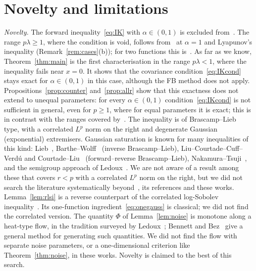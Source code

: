 \documentclass[11pt]{amsart}
\theoremstyle{definition}
\begin{document}
\section{Novelty and limitations}
\emph{Novelty.} The forward inequality~\eqref{eq:IK} with $\alpha\in(0,1)$ is excluded from~\cite[Thm.~9(i)]{IK25}.
The range $p\lambda\ge1$, where the condition is void, follows from~\cite[Thm.~9(i)]{IK25} at $\alpha=1$ and
Lyapunov's inequality (Remark~\ref{rem:cases}(b)); for two functions this is~\cite[Prop.~1.4(a)]{MF}. As far as we
know, Theorem~\ref{thm:main} is the first characterisation in the range $p\lambda<1$, where the inequality fails near
$x=0$. It shows that the covariance condition~\eqref{eq:IKcond} stays exact for $\alpha\in(0,1)$ in this case,
although the FB method does not apply. Propositions~\ref{prop:counter} and~\ref{prop:allr} show that this exactness does not extend to
unequal parameters: for every $\alpha\in(0,1)$ condition~\eqref{eq:IKcond} is not sufficient in general, even for
$p\ge1$, where for equal parameters it is exact; this is in contrast with the ranges covered
by~\cite[Thm.~9(i)]{IK25}. The inequality is of
Brascamp--Lieb type, with a correlated $L^p$ norm on the
right and degenerate Gaussian (exponential) extremisers. Gaussian saturation is known for many inequalities of this
kind: Lieb~\cite{Lieb90}, Barthe--Wolff~\cite{BW18} (inverse Brascamp--Lieb), Liu--Courtade--Cuff--Verd\'u and
Courtade--Liu~\cite{LCCV18,CL21} (forward--reverse Brascamp--Lieb), Nakamura--Tsuji~\cite{NT25}, and the semigroup
approach of Ledoux~\cite{Ledoux14}. We are not aware of a result among these that covers $r<p$ with a correlated
$L^p$ norm on the right, but we did not search the literature systematically beyond~\cite{IK25}, its references and
these works. Lemma~\ref{lem:rlsi} is a reverse counterpart of the correlated log-Sobolev
inequality~\cite[Thm.~11]{IK25}. Its one-function ingredient~\eqref{eq:onegauss} is classical; we did not find the
correlated version. The quantity $\Phi$ of Lemma~\ref{lem:noise} is monotone along a heat-type flow, in the tradition surveyed
by Ledoux~\cite{Ledoux14}; Bennett and Bez~\cite{BB19} give a general method for generating such quantities. We did
not find the flow with separate noise parameters, or a one-dimensional criterion like Theorem~\ref{thm:noise}, in
these works. Novelty is claimed to the best of this search.
\end{document}
